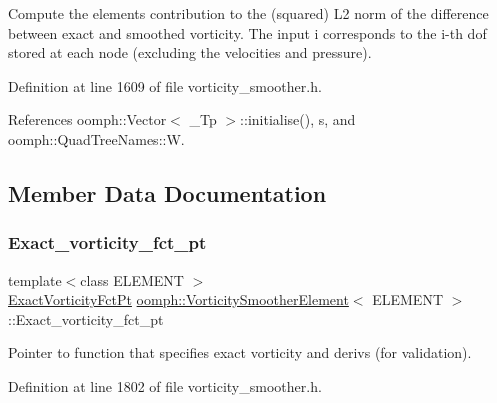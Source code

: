 Compute the element\textquotesingle{}s contribution to the (squared) L2 norm of the difference between exact and smoothed vorticity. The input i corresponds to the i-\/th dof stored at each node (excluding the velocities and pressure). 



Definition at line 1609 of file vorticity\+\_\+smoother.\+h.



References oomph\+::\+Vector$<$ \+\_\+\+Tp $>$\+::initialise(), s, and oomph\+::\+Quad\+Tree\+Names\+::W.



\subsection{Member Data Documentation}
\mbox{\label{classoomph_1_1VorticitySmootherElement_a63f838b49c19f7c3686c50b455da2e36}} 
\subsubsection{\texorpdfstring{Exact\+\_\+vorticity\+\_\+fct\+\_\+pt}{Exact\_vorticity\_fct\_pt}}
{\footnotesize\ttfamily template$<$class E\+L\+E\+M\+E\+NT $>$ \\
\hyperlink{classoomph_1_1VorticitySmootherElement_ad4ed9d81ba7718bf747e0abdd41cdaa1}{Exact\+Vorticity\+Fct\+Pt} \hyperlink{classoomph_1_1VorticitySmootherElement}{oomph\+::\+Vorticity\+Smoother\+Element}$<$ E\+L\+E\+M\+E\+NT $>$\+::Exact\+\_\+vorticity\+\_\+fct\+\_\+pt\hspace{0.3cm}{\ttfamily [private]}}



Pointer to function that specifies exact vorticity and derivs (for validation). 



Definition at line 1802 of file vorticity\+\_\+smoother.\+h.

\mbox{\label{classoomph_1_1VorticitySmootherElement_a6ca5c212c0bd7db1a492bbf255f247cc}} 
